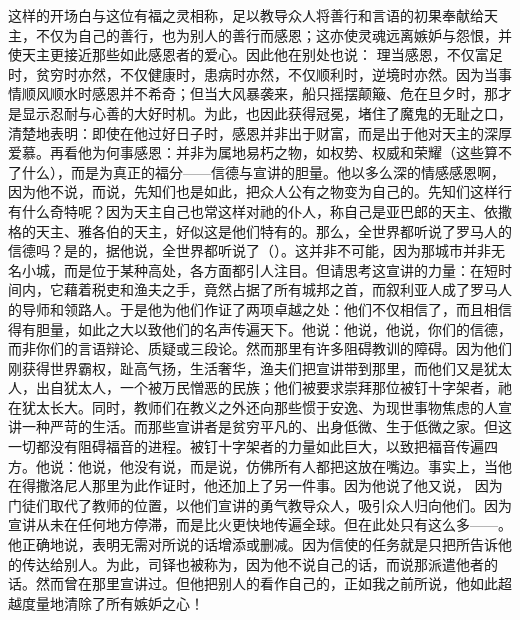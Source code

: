 这样的开场白与这位有福之灵相称，足以教导众人将善行和言语的初果奉献给天主，不仅为自己的善行，也为别人的善行而感恩；这亦使灵魂远离嫉妒与怨恨，并使天主更接近那些如此感恩者的爱心。因此他在别处也说： 理当感恩，不仅富足时，贫穷时亦然，不仅健康时，患病时亦然，不仅顺利时，逆境时亦然。因为当事情顺风顺水时感恩并不希奇；但当大风暴袭来，船只摇摆颠簸、危在旦夕时，那才是显示忍耐与心善的大好时机。为此，也因此获得冠冕，堵住了魔鬼的无耻之口，清楚地表明：即使在他过好日子时，感恩并非出于财富，而是出于他对天主的深厚爱慕。再看他为何事感恩：并非为属地易朽之物，如权势、权威和荣耀（这些算不了什么），而是为真正的福分——信德与宣讲的胆量。他以多么深的情感感恩啊，因为他不说，而说，先知们也是如此，把众人公有之物变为自己的。先知们这样行有什么奇特呢？因为天主自己也常这样对祂的仆人，称自己是亚巴郎的天主、依撒格的天主、雅各伯的天主，好似这是他们特有的。那么，全世界都听说了罗马人的信德吗？是的，据他说，全世界都听说了（）。这并非不可能，因为那城市并非无名小城，而是位于某种高处，各方面都引人注目。但请思考这宣讲的力量：在短时间内，它藉着税吏和渔夫之手，竟然占据了所有城邦之首，而叙利亚人成了罗马人的导师和领路人。于是他为他们作证了两项卓越之处：他们不仅相信了，而且相信得有胆量，如此之大以致他们的名声传遍天下。他说：他说，他说，你们的信德，而非你们的言语辩论、质疑或三段论。然而那里有许多阻碍教训的障碍。因为他们刚获得世界霸权，趾高气扬，生活奢华，渔夫们把宣讲带到那里，而他们又是犹太人，出自犹太人，一个被万民憎恶的民族；他们被要求崇拜那位被钉十字架者，祂在犹太长大。同时，教师们在教义之外还向那些惯于安逸、为现世事物焦虑的人宣讲一种严苛的生活。而那些宣讲者是贫穷平凡的、出身低微、生于低微之家。但这一切都没有阻碍福音的进程。被钉十字架者的力量如此巨大，以致把福音传遍四方。他说：他说，他没有说，而是说，仿佛所有人都把这放在嘴边。事实上，当他在得撒洛尼人那里为此作证时，他还加上了另一件事。因为他说了他又说， 因为门徒们取代了教师的位置，以他们宣讲的勇气教导众人，吸引众人归向他们。因为宣讲从未在任何地方停滞，而是比火更快地传遍全球。但在此处只有这么多——。他正确地说，表明无需对所说的话增添或删减。因为信使的任务就是只把所告诉他的传达给别人。为此，司铎也被称为，因为他不说自己的话，而说那派遣他者的话。然而曾在那里宣讲过。但他把别人的看作自己的，正如我之前所说，他如此超越度量地清除了所有嫉妒之心！\par

